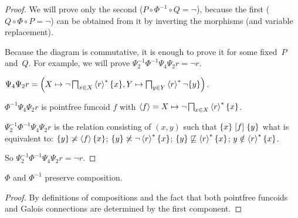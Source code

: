 \begin{proof}
We will prove only the second ($P\circ \Phi^{-1}\circ Q = \lnot$), because the first ($Q\circ\Phi\circ P= \lnot$)
can be obtained from it by inverting the morphisms (and variable replacement).

Because the diagram is commutative, it is enough to prove it for some fixed~$P$ and~$Q$.
For example, we will prove $\Psi_2^{-1} \Phi^{-1} \Psi_4 \Psi_2 r = \neg r$.

$\Psi_4 \Psi_2 r = \left( X \mapsto \neg \bigsqcap_{x \in X} \left\langle r\right\rangle ^{\ast}
\{ x \} , Y \mapsto \bigsqcap_{y \in Y} \left\langle r\right\rangle ^{\ast} \neg \{ y \} \right)$.

$\Phi^{-1} \Psi_4 \Psi_2 r$ is pointfree funcoid $f$ with $\left\langle f\right\rangle
= X \mapsto \neg \bigsqcap_{x \in X} \left\langle r\right\rangle ^{\ast} \{ x \}$.

$\Psi_2^{-1} \Phi^{-1} \Psi_4 \Psi_2 r$ is the relation consisting of $(x ,
y)$ such that $\{ x \} \mathrel{\left[f\right]} \{ y \}$ what is equivalent to: $\{ y \}
\not\asymp \left\langle f\right\rangle \{ x \}$; $\{ y \} \not\asymp \neg \left\langle r\right\rangle ^{\ast} \{ x \}$; $\{ y \} \not\sqsubseteq \left\langle r\right\rangle ^{\ast} \{ x \}$; $y \notin \left\langle r\right\rangle ^{\ast} \{ x \}$.

So $\Psi_2^{-1} \Phi^{-1} \Psi_4 \Psi_2 r = \neg r$.
\end{proof}

\begin{prop}
$\Phi$ and $\Phi^{-1}$ preserve composition.
\end{prop}

\begin{proof}
By definitions of compositions and the fact that both pointfree funcoids and Galois connections are determined by the first component.
\end{proof}
